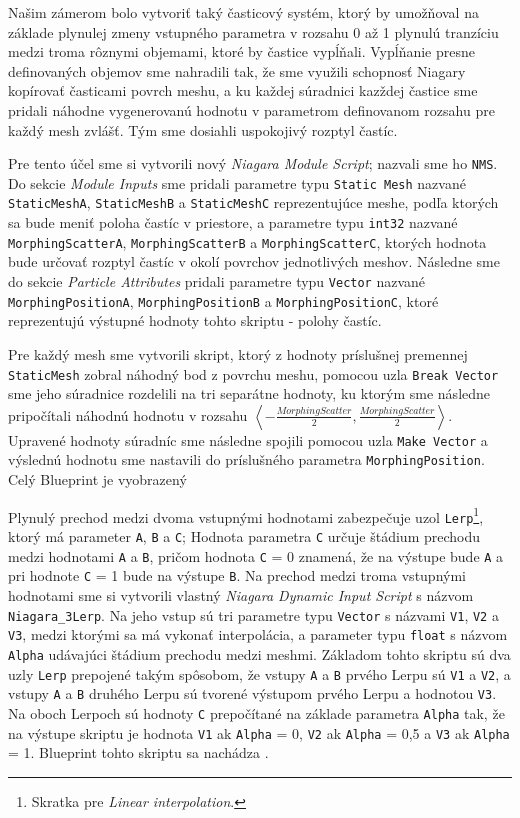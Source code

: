 Našim zámerom bolo vytvoriť taký časticový systém, ktorý by umožňoval na základe plynulej zmeny vstupného parametra v rozsahu 0 až 1 plynulú tranzíciu medzi troma rôznymi objemami, ktoré by častice vypĺňali.
Vypĺňanie presne definovaných objemov sme nahradili tak, že sme využili schopnosť Niagary kopírovať časticami povrch meshu, a ku každej súradnici kazždej častice sme pridali náhodne vygenerovanú hodnotu v 
parametrom definovanom rozsahu pre každý mesh zvlášť. Tým sme dosiahli uspokojivý rozptyl častíc.

Pre tento účel sme si vytvorili nový \emph{Niagara Module Script}; nazvali sme ho \texttt{NMS}. Do sekcie \emph{Module Inputs} sme pridali parametre typu \texttt{Static Mesh} nazvané \texttt{StaticMeshA}, \texttt{StaticMeshB} a 
\texttt{StaticMeshC} reprezentujúce meshe, podľa ktorých sa bude meniť poloha častíc v priestore, a parametre typu \texttt{int32} nazvané \texttt{MorphingScatterA}, \texttt{MorphingScatterB} a \texttt{MorphingScatterC},
ktorých hodnota bude určovať rozptyl častíc v okolí povrchov jednotlivých meshov. Následne sme do sekcie \emph{Particle Attributes} pridali parametre typu \texttt{Vector} nazvané \texttt{MorphingPositionA}, 
\texttt{MorphingPositionB} a \texttt{MorphingPositionC}, ktoré reprezentujú výstupné hodnoty tohto skriptu - polohy častíc.

Pre každý mesh sme vytvorili skript, ktorý z hodnoty príslušnej premennej \texttt{StaticMesh} zobral náhodný bod z povrchu meshu, pomocou uzla \texttt{Break Vector} sme jeho súradnice rozdelili na tri 
separátne hodnoty, ku ktorým sme následne pripočítali náhodnú hodnotu v rozsahu \(\left<-\frac{MorphingScatter}{2}, \frac{MorphingScatter}{2}\right>\). Upravené hodnoty súradníc sme následne spojili pomocou uzla 
\texttt{Make Vector} a výslednú hodnotu sme nastavili do príslušného parametra \texttt{MorphingPosition}. Celý Blueprint je vyobrazený 

Plynulý prechod medzi dvoma vstupnými hodnotami zabezpečuje uzol \texttt{Lerp}\footnote{Skratka pre \emph{Linear interpolation}.}, ktorý má parameter \texttt{A}, \texttt{B} a \texttt{C};
Hodnota parametra \texttt{C} určuje štádium prechodu medzi hodnotami \texttt{A} a \texttt{B}, pričom hodnota \texttt{C} = 0 znamená, že na výstupe bude \texttt{A} a pri hodnote \texttt{C} = 1 bude na výstupe \texttt{B}.
Na prechod medzi troma vstupnými hodnotami sme si vytvorili vlastný \emph{Niagara Dynamic Input Script} s názvom \texttt{Niagara\_3Lerp}. Na jeho vstup sú tri parametre typu \texttt{Vector} s názvami \texttt{V1}, 
\texttt{V2} a \texttt{V3}, medzi ktorými sa má vykonať interpolácia, a parameter typu \texttt{float} s názvom \texttt{Alpha} udávajúci štádium prechodu medzi meshmi. Základom tohto skriptu sú dva uzly \texttt{Lerp} 
prepojené takým spôsobom, že vstupy \texttt{A} a \texttt{B} prvého Lerpu sú \texttt{V1} a \texttt{V2}, a vstupy \texttt{A} a \texttt{B} druhého Lerpu sú tvorené výstupom prvého Lerpu a hodnotou \texttt{V3}.
Na oboch Lerpoch sú hodnoty \texttt{C} prepočítané na základe parametra \texttt{Alpha} tak, že na výstupe skriptu je hodnota \texttt{V1} ak \texttt{Alpha} = 0, \texttt{V2} ak \texttt{Alpha} = 0,5 a \texttt{V3} 
ak \texttt{Alpha} = 1. Blueprint tohto skriptu sa nachádza .

